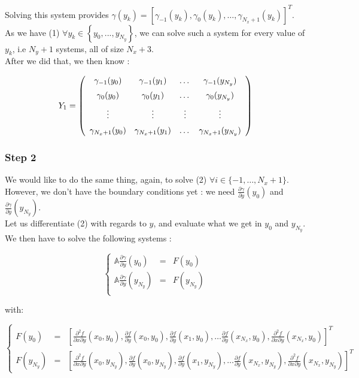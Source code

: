 \documentclass[10pt]{article}
\begin{document}
Solving this system provides $\gamma (y_k) = \left[ \gamma_{-1} (y_k), \gamma_{0} (y_k), \dots , \gamma_{N_x+1} (y_k) \right] ^T $.\\

As we have (1) $\forall y_k \in \left\lbrace y_0,..., y_{N_y} \right\rbrace$, we can solve such a system for every value of $y_k$, i.e $N_y+1$ systems, all of size $N_x+3$.\\

After we did that, we then know :

$$Y_1 = \left( 
\begin{array}{cccc}
\gamma_{-1} (y_0) & \gamma_{-1} (y_1) & \dots & \gamma_{-1} (y_{N_y}) \vspace{2 mm}\\
\gamma_{0} (y_0) & \gamma_{0} (y_1) & \dots & \gamma_{0} (y_{N_y}) \vspace{2 mm}\\ 
\vdots & \vdots & \vdots & \vdots \vspace{2 mm}\\
\gamma_{N_x+1} (y_0) & \gamma_{N_x+1} (y_1) & \dots & \gamma_{N_x+1} (y_{N_y})
\end{array}
\right)$$


\subsubsection{Step 2}


We would like to do the same thing, again, to solve (2) $\forall i \in \lbrace -1, \dots , N_x+1 \rbrace$.\\
However, we don't have the boundary conditions yet : we need $\frac{\partial \gamma}{\partial y}(y_0)$ and $\frac{\partial \gamma}{\partial y}(y_{N_y})$.\\

Let us differentiate (2) with regards to $y$, and evaluate what we get in $y_0$ and $y_{N_y}$. We then have to solve the following systems :

$$\left\lbrace
\begin{array}{ccc}
\mathbb{A} \frac{\partial \gamma}{\partial y} (y_0) &=& F(y_0)\\
\mathbb{A} \frac{\partial \gamma}{\partial y} (y_{N_y}) &=& F(y_{N_y})\\
\end{array}
\right.
$$

with:

$$\left\lbrace
\begin{array}{ccl}
 F(y_0) &=& \left[ \frac{\partial ^2 f}{\partial x \partial y}(x_0,y_0) , \frac{\partial f}{\partial y}(x_0,y_0), \frac{\partial f}{\partial y}(x_1,y_0),
 \dots 
\frac{\partial f}{\partial y}(x_{N_x},y_0),
\frac{\partial ^2 f}{\partial x \partial y}(x_{N_x},y_0) \right] ^T\\
 F(y_{N_y}) &=& \left[ \frac{\partial ^2 f}{\partial x \partial y}(x_0,y_{N_y}) , \frac{\partial f}{\partial y}(x_0,y_{N_y}), \frac{\partial f}{\partial y}(x_1,y_{N_y}),
 \dots 
\frac{\partial f}{\partial y}(x_{N_x},y_{N_y}),
\frac{\partial ^2 f}{\partial x \partial y}(x_{N_x},y_{N_y}) \right] ^T
\end{array}
\right.
$$
\end{document}

